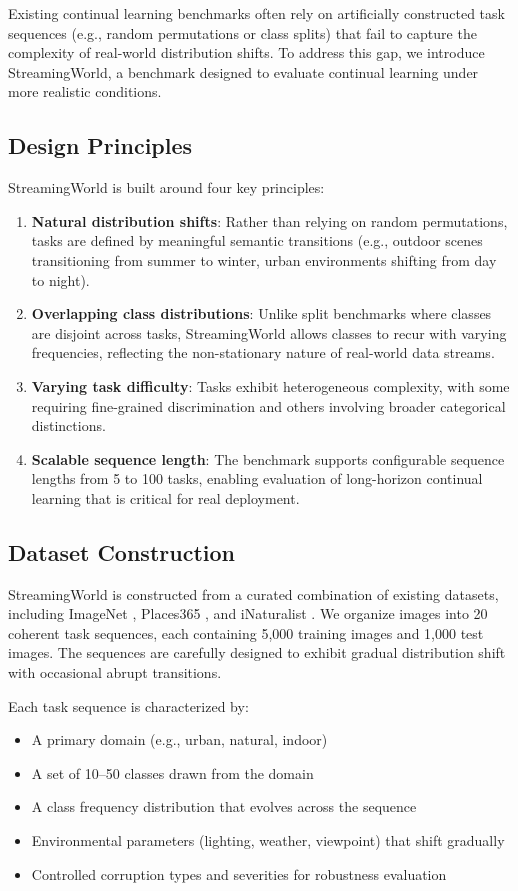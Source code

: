 \documentclass[11pt]{article}
\begin{document}
Existing continual learning benchmarks often rely on artificially constructed task sequences (e.g., random permutations or class splits) that fail to capture the complexity of real-world distribution shifts. To address this gap, we introduce StreamingWorld, a benchmark designed to evaluate continual learning under more realistic conditions.

\subsection{Design Principles}

StreamingWorld is built around four key principles:
\begin{enumerate}
    \item \textbf{Natural distribution shifts}: Rather than relying on random permutations, tasks are defined by meaningful semantic transitions (e.g., outdoor scenes transitioning from summer to winter, urban environments shifting from day to night).
    \item \textbf{Overlapping class distributions}: Unlike split benchmarks where classes are disjoint across tasks, StreamingWorld allows classes to recur with varying frequencies, reflecting the non-stationary nature of real-world data streams.
    \item \textbf{Varying task difficulty}: Tasks exhibit heterogeneous complexity, with some requiring fine-grained discrimination and others involving broader categorical distinctions.
    \item \textbf{Scalable sequence length}: The benchmark supports configurable sequence lengths from 5 to 100 tasks, enabling evaluation of long-horizon continual learning that is critical for real deployment.
\end{enumerate}

\subsection{Dataset Construction}

StreamingWorld is constructed from a curated combination of existing datasets, including ImageNet \citep{deng2009imagenet}, Places365 \citep{zhou2017places}, and iNaturalist \citep{van2018inaturalist}. We organize images into 20 coherent task sequences, each containing 5,000 training images and 1,000 test images. The sequences are carefully designed to exhibit gradual distribution shift with occasional abrupt transitions.

Each task sequence is characterized by:
\begin{itemize}
    \item A primary domain (e.g., urban, natural, indoor)
    \item A set of 10--50 classes drawn from the domain
    \item A class frequency distribution that evolves across the sequence
    \item Environmental parameters (lighting, weather, viewpoint) that shift gradually
    \item Controlled corruption types and severities for robustness evaluation
\end{itemize}
\end{document}
